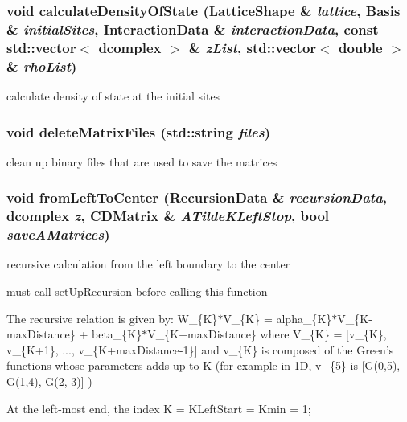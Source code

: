 \subsubsection{\setlength{\rightskip}{0pt plus 5cm}void calculate\-Density\-Of\-State (\bf{Lattice\-Shape} \& {\em lattice}, \bf{Basis} \& {\em initial\-Sites}, \bf{Interaction\-Data} \& {\em interaction\-Data}, const std::vector$<$ \bf{dcomplex} $>$ \& {\em z\-List}, std::vector$<$ double $>$ \& {\em rho\-List})}\label{recursiveCalculation_8cpp_606df39775b7266829a71b5550656fb1}


calculate density of state at the initial sites 
\subsubsection{\setlength{\rightskip}{0pt plus 5cm}void delete\-Matrix\-Files (std::string {\em files})}\label{recursiveCalculation_8cpp_09bb0743532eb10149446411001b1a13}


clean up binary files that are used to save the matrices 
\subsubsection{\setlength{\rightskip}{0pt plus 5cm}void from\-Left\-To\-Center (\bf{Recursion\-Data} \& {\em recursion\-Data}, \bf{dcomplex} {\em z}, \bf{CDMatrix} \& {\em ATilde\-KLeft\-Stop}, bool {\em save\-AMatrices})}\label{recursiveCalculation_8cpp_688998cb6b3bb9cb3a37353ee115f303}


recursive calculation from the left boundary to the center

must call set\-Up\-Recursion before calling this function 

The recursive relation is given by: W\_\-\{K\}$\ast$V\_\-\{K\} = alpha\_\-\{K\}$\ast$V\_\-\{K-max\-Distance\} + beta\_\-\{K\}$\ast$V\_\-\{K+max\-Distance\} where V\_\-\{K\} = [v\_\-\{K\}, v\_\-\{K+1\}, ..., v\_\-\{K+max\-Distance-1\}] and v\_\-\{K\} is composed of the Green's functions whose parameters adds up to K (for example in 1D, v\_\-\{5\} is [G(0,5), G(1,4), G(2, 3)] )

At the left-most end, the index K = KLeft\-Start = Kmin = 1;

